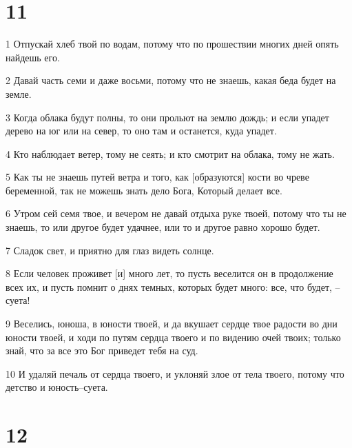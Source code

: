 \chapter{11}

\par 1 Отпускай хлеб твой по водам, потому что по прошествии многих дней опять найдешь его.
\par 2 Давай часть семи и даже восьми, потому что не знаешь, какая беда будет на земле.
\par 3 Когда облака будут полны, то они прольют на землю дождь; и если упадет дерево на юг или на север, то оно там и останется, куда упадет.
\par 4 Кто наблюдает ветер, тому не сеять; и кто смотрит на облака, тому не жать.
\par 5 Как ты не знаешь путей ветра и того, как [образуются] кости во чреве беременной, так не можешь знать дело Бога, Который делает все.
\par 6 Утром сей семя твое, и вечером не давай отдыха руке твоей, потому что ты не знаешь, то или другое будет удачнее, или то и другое равно хорошо будет.
\par 7 Сладок свет, и приятно для глаз видеть солнце.
\par 8 Если человек проживет [и] много лет, то пусть веселится он в продолжение всех их, и пусть помнит о днях темных, которых будет много: все, что будет, --суета!
\par 9 Веселись, юноша, в юности твоей, и да вкушает сердце твое радости во дни юности твоей, и ходи по путям сердца твоего и по видению очей твоих; только знай, что за все это Бог приведет тебя на суд.
\par 10 И удаляй печаль от сердца твоего, и уклоняй злое от тела твоего, потому что детство и юность--суета.

\chapter{12}

